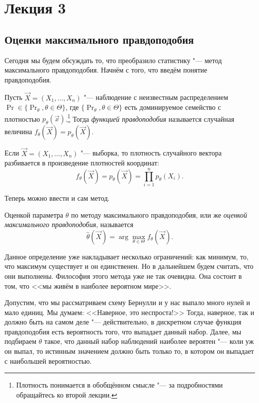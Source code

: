 \section{Лекция 3}
\subsection{Оценки максимального правдоподобия}
Сегодня мы будем обсуждать то, что преобразило статистику "--- метод максимального правдоподобия. Начнём с того, что введём понятие правдоподобия.
\begin{definition}
    Пусть $\vec{X} = (X_{1}, \ldots, X_{n})$ "--- наблюдение с неизвестным распределением $\Pr \in \{\Pr_{\theta}, \theta \in \Theta\}$, где $\{\Pr_{\theta}, \theta \in \Theta\}$ есть доминируемое семейство с плотностью $p_{\theta}(\vec{x})$.\footnote{Плотность понимается в обобщённом смысле "--- за подробностями обращайтесь ко второй лекции.} Тогда \emph{функцией правдоподобия} называется случайная величина $f_{\theta}(\vec{X}) = p_{\theta}(\vec{X})$.
\end{definition}
\begin{remark}
    Если $\vec{X} = (X_{1}, \ldots, X_{n})$ "--- выборка, то плотность случайного вектора разбивается в произведение плотностей координат:
    \[
        f_{\theta}(\vec{X}) = p_{\theta}(\vec{X}) = \prod_{i = 1}^{n} p_{\theta}(X_{i}).
    \]
\end{remark}
Теперь можно ввести и сам метод.
\begin{definition}
    Оценкой параметра $\theta$ по методу максимального правдоподобия, или же \emph{оценкой максимального правдоподобия}, называется
    \[
        \hat{\theta}(\vec{X}) = \arg\max_{\theta \in \Theta} f_{\theta}(\vec{X}).
    \]
\end{definition}
Данное определение уже накладывает несколько ограничений: как минимум, то, что максимум существует и он единственен. Но в дальнейшем будем считать, что они выполнены. Философия этого метода уже не так очевидна. Она состоит в том, что <<мы живём в наиболее вероятном мире>>.

Допустим, что мы рассматриваем схему Бернулли и у нас выпало много нулей и мало единиц. Мы думаем: <<Наверное, это неспроста!>> Тогда, наверное, так и должно быть на самом деле "--- действительно, в дискретном случае функция правдоподобия есть вероятность того, что выпадает данный набор. Далее, мы подбираем $\theta$ такое, что данный набор наблюдений наиболее вероятен "--- коли уж он выпал, то истинным значением должно быть только то, в котором он выпадает с наибольшей вероятностью.

